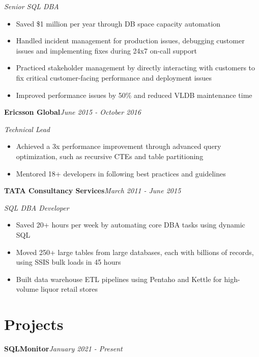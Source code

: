 \documentclass[10pt,a4paper]{article}
\begin{document}
\textit{Senior SQL DBA}\\[-5pt]
\begin{itemize}
  \item Saved \$1 million per year through DB space capacity automation
  \item Handled incident management for production issues, debugging customer issues and implementing fixes during 24x7 on-call support
  \item Practiced stakeholder management by directly interacting with customers to fix critical customer-facing performance and deployment issues
  \item Improved performance issues by 50\% and reduced VLDB maintenance time
\end{itemize}
\vspace{14.7pt}
\noindent\textbf{Ericsson Global}\hfill \textit{June 2015 - October 2016}

\textit{Technical Lead}\\[-5pt]
\begin{itemize}
  \item Achieved a 3x performance improvement through advanced query optimization, such as recursive CTEs and table partitioning
  \item Mentored 18+ developers in following best practices and guidelines
\end{itemize}
\vspace{14.7pt}
\noindent\textbf{TATA Consultancy Services}\hfill \textit{March 2011 - June 2015}

\textit{SQL DBA Developer}\\[-5pt]
\begin{itemize}
  \item Saved 20+ hours per week by automating core DBA tasks using dynamic SQL
  \item Moved 250+ large tables from large databases, each with billions of records, using SSIS bulk loads in 45 hours
  \item Built data warehouse ETL pipelines using Pentaho and Kettle for high-volume liquor retail stores
\end{itemize}

\section{Projects}

\noindent\textbf{SQLMonitor}\hfill \textit{January 2021 - Present}
\end{document}
